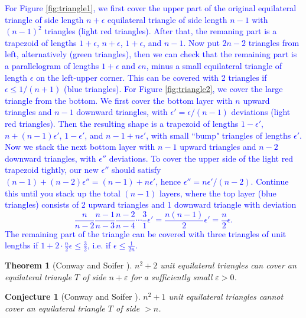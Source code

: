 \documentclass[a4paper]{amsart}
\theoremstyle{plain}
\newtheorem{theorem}{Theorem}
\newtheorem{conjecture}{Conjecture}
\theoremstyle{definition}
\begin{document}
\textcolor{blue}{
For Figure \ref{fig:triangle1}, we first cover the upper part of the original equilateral triangle of side length $n+\epsilon$ equilateral triangle of side length $n-1$ with $(n-1)^2$ triangles (light red triangles). After that, the remaning part is a trapezoid of lengths $1+\epsilon$, $n+\epsilon$, $1+\epsilon$, and $n-1$. Now put $2n-2$ triangles from left, alternatively (green triangles), then we can check that the remaining part is a parallelogram of lengths $1+\epsilon$ and $\epsilon n$, minus a small equilateral triangle of length $\epsilon$ on the left-upper corner.
This can be covered with 2 triangles if $\epsilon \leq 1 / (n + 1)$ (blue triangles).
\newline
For Figure \ref{fig:triangle2}, we cover the large triangle from the bottom. We first cover the bottom layer with $n$ upward triangles and $n-1$ downward triangles, with $\epsilon' = \epsilon / (n-1)$ deviations (light red triangles). Then the resulting shape is a trapezoid of lengths $1 - \epsilon'$, $n +(n-1)\epsilon'$, $1 - \epsilon'$, and $n - 1 + n\epsilon'$, with small ``bump" triangles of lengths $\epsilon'$. Now we stack the next bottom layer with $n-1$ upward triangles and $n-2$ downward triangles, with $\epsilon''$ deviations. To cover the upper side of the light red trapezoid tightly, our new $\epsilon''$ should satisfy $(n-1) + (n-2)\epsilon'' = (n-1) + n\epsilon'$, hence $\epsilon'' = n\epsilon' / (n-2)$. Continue this until you stack up the total $(n-1)$ layers, where the top layer (blue triangles) consists of 2 upward triangles and 1 downward triangle with deviation
$$
\frac{n}{n-2} \frac{n-1}{n-3} \frac{n-2}{n-4} \cdots \frac{3}{1} \epsilon' = \frac{n(n-1)}{2} \epsilon' = \frac{n}{2} \epsilon.
$$
The remaining part of the triangle can be covered with three triangles of unit lengths if $1 + 2\cdot \frac{n}{2}\epsilon \le \frac{3}{2}$, i.e. if $\epsilon \leq \frac{1}{2n}$.
}


\begin{theorem}[Conway and Soifer \cite{conway2004coverup, conway2005covering}]
\label{thm:main-prev}
$n^2 + 2$ unit equilateral triangles can cover an equilateral triangle $T$ of side $n + \varepsilon$ for a sufficiently small $\varepsilon > 0$.
\end{theorem}

\begin{conjecture}[Conway and Soifer \cite{conway2004coverup}]
\label{conj:main}
$n^2 + 1$ unit equilateral triangles cannot cover an equilateral triangle $T$ of side $> n$.
\end{conjecture}
\end{document}
